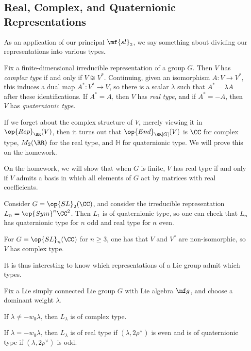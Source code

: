 \documentclass[../notes.tex]{subfiles}
\begin{document}
\subsection{Real, Complex, and Quaternionic Representations}
As an application of our principal $\mf{sl}_2$, we say something about dividing our representations into various types.
\begin{defihelper}   
	Fix a finite-dimensional irreducible representation of a group $G$. Then $V$ has \textit{complex type} if and only if $V\not\cong V^*$. Continuing, given an isomorphism $A\colon V\to V^*$, this induces a dual map $A^*\colon V^*\to V$, so there is a scalar $\lambda$ such that $A^*=\lambda A$ after these identifications. If $A^*=A$, then $V$ has \textit{real type}, and if $A^*=-A$, then $V$ has \textit{quaternionic type}.\todo{}
\end{defihelper}
\begin{remark}
	If we forget about the complex structure of $V$, merely viewing it in $\op{Rep}_\RR(V)$, then it turns out that $\op{End}_{\RR[G]}(V)$ is $\CC$ for complex type, $M_2(\RR)$ for the real type, and $\mathbb H$ for quaternionic type. We will prove this on the homework.
\end{remark}
\begin{remark}
	On the homework, we will show that when $G$ is finite, $V$ has real type if and only if $V$ admits a basis in which all elements of $G$ act by matrices with real coefficients.
\end{remark}
\begin{example} \label{ex:sl2-types}
	Consider $G=\op{SL}_2(\CC)$, and consider the irreducible representation $L_n=\op{Sym}^n\CC^2$. Then $L_1$ is of quaternionic type, so one can check that $L_n$ has quaternionic type for $n$ odd and real type for $n$ even.
\end{example}
\begin{example}
	For $G=\op{SL}_n(\CC)$ for $n\ge3$, one has that $V$ and $V^*$ are non-isomorphic, so $V$ has complex type.
\end{example}
It is thus interesting to know which representations of a Lie group admit which types.
\begin{proposition} \label{prop:check-type}
	Fix a Lie simply connected Lie group $G$ with Lie algebra $\mf g$, and choose a dominant weight $\lambda$.
	\begin{listalph}
		\item If $\lambda\ne-w_0\lambda$, then $L_\lambda$ is of complex type.
		\item If $\lambda=-w_0\lambda$, then $L_\lambda$ is of real type if $(\lambda,2\rho^\lor)$ is even and is of quaternionic type if $(\lambda,2\rho^\lor)$ is odd.
	\end{listalph}
\end{proposition}
\end{document}
